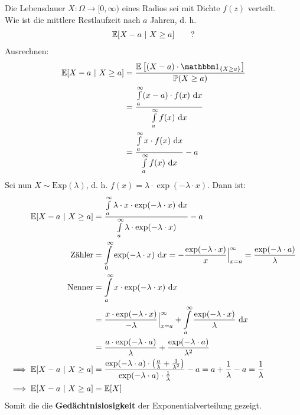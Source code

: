 \begin{beisp}[Lebensdaueranalyse]\enter
Die Lebensdauer $X:\Omega\to[0,\infty)$ eines Radios sei mit Dichte $f(z)$ verteilt.\\
Wie ist die mittlere Restlaufzeit nach $a$ Jahren, d. h. 
\begin{align*}
\mathbb{E}[X-a~|~X\geq a]\qquad?
\end{align*}
Ausrechnen:
\begin{align*}
\E[X-a~|~X\geq a] 
&=\frac{\E\left[(X-a)\cdot\indi_{\{X\geq a\}}\right]}{\P(X\geq a)}\\
&=\frac{\int\limits_a^\infty (x-a)\cdot f(x)\d x}{\int\limits_a^\infty f(x)\d x}\\
&=\frac{\int\limits_a^\infty x\cdot f(x)\d x}{\int\limits_a^\infty f(x)\d x}-a
\end{align*}
Sei nun $X\sim\text{Exp}(\lambda)$, d. h. $f(x)=\lambda\cdot\exp(-\lambda\cdot x)$. Dann ist:
\begin{align*}
\mathbb{E}[X-a~|~X\geq a]
&=\frac{\int\limits_a^\infty \lambda\cdot x\cdot\exp(-\lambda\cdot x)\text{ d} x}{\int\limits_a^\infty\lambda\cdot\exp(-\lambda\cdot x)}-a\\
\text{Zähler}&=\int\limits_0^\infty\exp(-\lambda\cdot x)\text{ d} x=-\frac{\exp(-\lambda\cdot x)}{x}\Big|_{x=a}^\infty=\frac{\exp(-\lambda\cdot a)}{\lambda}\\
\text{Nenner} &=\int\limits_a^\infty x\cdot\exp(-\lambda\cdot x)\text{ d} x\\
&=\frac{x\cdot\exp(-\lambda\cdot x)}{-\lambda}\Big|_{x=a}^\infty+\int\limits_a^\infty\frac{\exp(-\lambda\cdot x)}{\lambda}\text{ d} x\\
&=\frac{a\cdot\exp(-\lambda\cdot a)}{\lambda}+\frac{\exp(-\lambda\cdot a)}{\lambda^2}\\
\implies
\mathbb{E}[X-a~|~X\geq a]&=\frac{\exp(-\lambda\cdot a)\cdot\left(\frac{a}{\lambda}+\frac{1}{\lambda^2}\right)}{\exp(-\lambda\cdot a)\cdot\frac{1}{\lambda}}-a=a+\frac{1}{\lambda}-a=\frac{1}{\lambda}\\
\implies
\mathbb{E}[X-a~|~X\geq a]&=\mathbb{E}[X]
\end{align*}
Somit die die \textbf{Gedächtnislosigkeit} der Exponentialverteilung gezeigt.
\end{beisp}
